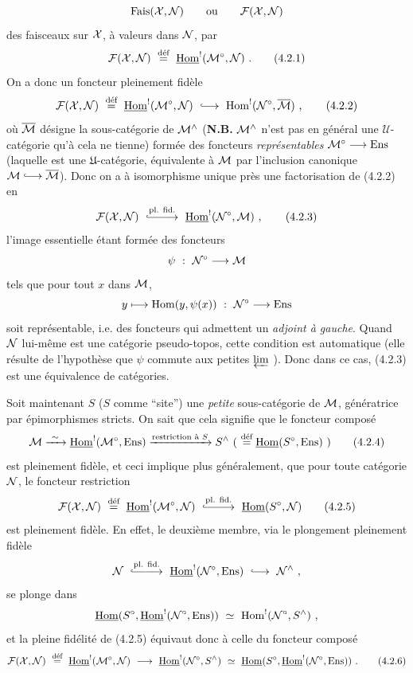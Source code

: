 \[
\mathrm{Fais}(\mathcal{X},\mathcal{N}) \qquad \text{ou} \qquad \mathcal{F}(\mathcal{X},\mathcal{N})
\]
des faisceaux sur $\mathcal{X}$, à valeurs dans $\mathcal{N}$, par
\[
\cF(\cX,\cN) \ \defeq\ \uHom^{!}(\cM^{\circ},\cN) \ .
\tag*{(4.2.1)}
\]
On a donc un foncteur pleinement fidèle
\[
\cF(\cX,\cN) \ \defeq\ \uHom^{!}(\cM^{\circ},\cN) \ \linj\ \Hom^{!}(\cN^{\circ},\overline{\cM}) \ ,
\tag*{(4.2.2)}
\]
où $\overline{\mathcal{M}}$ désigne la sous-catégorie de $\mathcal{M}^{\wedge}$ (\textbf{N.B.} $\mathcal{M}^{\wedge}$ n'est pas en général une $\mathcal{U}$-catégorie qu'à cela ne tienne) formée des foncteurs \textit{représentables} $\mathcal{M}^{\circ}\longrightarrow\mathrm{Ens}$ (laquelle est une $\mathfrak{U}$-catégorie, équivalente à $\mathcal{M}$ par l'inclusion canonique $\cM \linj \overline{\cM}$). Donc on a à isomorphisme unique près une factorisation de (4.2.2) en
\[
\cF(\cX,\cN) \ \overset{\text{pl. fid.}}{\lhook\joinrel\relbar\joinrel\relbar\joinrel\longrightarrow}\ \uHom^{!}(\cN^{\circ},\cM) \ ,
\tag*{(4.2.3)}
\]
l'image essentielle étant formée des foncteurs
\[
\psi \ :\ \mathcal{N}^{\circ} \longrightarrow \mathcal{M}
\]
tels que pour tout $x$ dans $\mathcal{M}$,
\[
y \longmapsto \mathrm{Hom}(y,\psi(x)) \ :\ \mathcal{N}^{\circ} \longrightarrow \mathrm{Ens}
\]
soit représentable, i.e. des foncteurs qui
admettent un \textit{adjoint à gauche}. Quand $\mathcal{N}$ lui-même est une catégorie pseudo-topos, cette condition est automatique (elle résulte de l'hypothèse que $\psi$ commute aux petites $\varprojlim$ ). Donc dans ce cas, (4.2.3) est une équivalence de catégories.

Soit maintenant $S$ ($S$ comme “site”) une \textit{petite} sous-catégorie de $\mathcal{M}$, génératrice par épimorphismes stricts. On sait que cela signifie que le foncteur composé
\[
\cM \xrightarrow{\ \sim\ } \uHom^{!}(\cM^{\circ},\Ens) \xrightarrow{\text{restriction à } S} S^{\wedge} \ (\ \defeq \uHom(S^{\circ},\Ens)\ )
\tag*{(4.2.4)}
\]
est pleinement fidèle, et ceci implique plus généralement, que pour toute catégorie $\mathcal{N}$, le foncteur restriction
\[
\cF(\cX,\cN) \ \defeq\ \uHom^{!}(\cM^{\circ},\cN) \ \overset{\text{pl. fid.}}{\lhook\joinrel\relbar\joinrel\relbar\joinrel\longrightarrow}\ \uHom(S^{\circ},\cN)
\tag*{(4.2.5)}
\]
est pleinement fidèle. En effet, le deuxième membre, via le plongement pleinement fidèle
\[
\cN \ \overset{\text{pl. fid.}}{\lhook\joinrel\relbar\joinrel\relbar\joinrel\longrightarrow}\ \uHom^{!}(\cN^{\circ},\Ens) \ \linj\ \cN^{\wedge} \ ,
\]
se plonge dans
\[
\uHom(S^{\circ},\uHom^{!}(\cN^{\circ},\Ens)) \ \simeq\ \Hom^{!}(\cN^{\circ},S^{\wedge}) \ ,
\]
et la pleine fidélité de (4.2.5) équivaut donc à celle du foncteur composé
\[
\cF(\cX,\cN) \ \defeq\ \uHom^{!}(\cM^{\circ},\cN) \ \longrightarrow\ \uHom^{!}(\cN^{\circ},S^{\wedge}) \ \simeq\ \uHom(S^{\circ},\uHom^{!}(\cN^{\circ},\Ens)) \ .
\tag*{(4.2.6)}
\]

